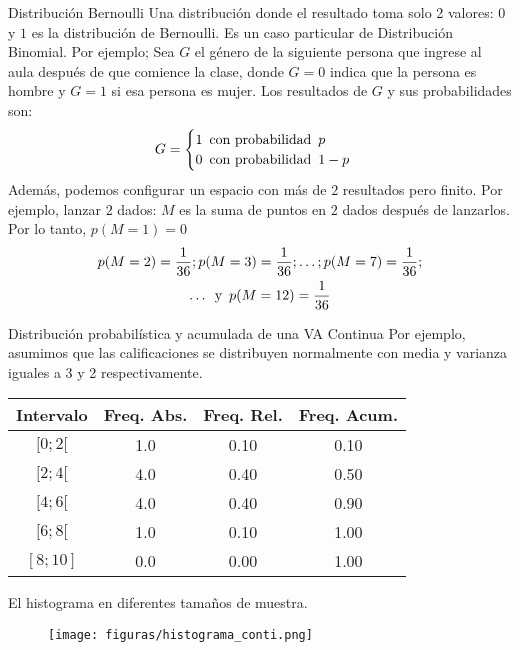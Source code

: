 {\small
	\begin{frame}{Distribución Bernoulli}
		Una distribución donde el resultado toma solo 2 valores: $0$ y $1$ es la distribución de Bernoulli. Es un caso particular de Distribución Binomial. Por ejemplo; Sea $G$ el género de la siguiente persona que ingrese al aula después de que comience la clase, donde $G=0$ indica que la persona es hombre y $G=1$ si esa persona es mujer. Los resultados de $G$ y sus probabilidades son:
		\begin{equation*}
			G =	\begin{cases}
				1\enskip \textup{con probabilidad}\enskip p\\
				0\enskip \textup{con probabilidad}\enskip 1-p
			\end{cases}
		\end{equation*}
		Además, podemos configurar un espacio con más de $2$ resultados pero finito. Por ejemplo, lanzar $2$ dados: $M$ es la suma de puntos en $2$ dados después de lanzarlos. Por lo tanto, $p(M=1)=0$
		\begin{gather*}
			p(M=2)= \frac{1}{36};p(M=3)= \frac{1}{36}; \ldots;p(M=7)= \frac{1}{36};\\
			\ldots \enskip \textup{y}\enskip p(M=12)= \frac{1}{36}
		\end{gather*}
\end{frame}}
\begin{frame}{Distribución probabilística y acumulada de una VA Continua}
	Por ejemplo, asumimos que las calificaciones se distribuyen normalmente con media y varianza iguales a 3 y 2 respectivamente.
	\begin{table}
		\centering
		\begin{tabular}{cccc}
			\hline
			Intervalo & Freq. Abs. & Freq. Rel. & Freq. Acum.\\
			\hline
			$[0;2[$  & 1.0 & 0.10 & 0.10\\
			$[2;4[$  & 4.0 & 0.40 & 0.50\\
			$[4;6[$  & 4.0 & 0.40 & 0.90\\
			$[6;8[$  & 1.0 & 0.10 & 1.00\\
			$[8;10]$ & 0.0 & 0.00 & 1.00\\
			\hline
		\end{tabular}
	\end{table}
\end{frame}
\begin{frame}{El histograma en diferentes tamaños de muestra.}
	\begin{figure}
		\centering
		\texttt{[image: figuras/histograma\_conti.png]}
	\end{figure}
\end{frame}

